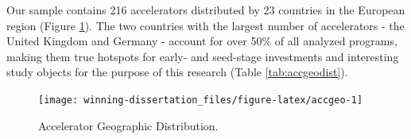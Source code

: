 \documentclass[
  12pt,
]{article}
\begin{document}
Our sample contains 216 accelerators distributed by 23 countries in the European region (Figure \ref{fig:accgeo}). The two countries with the largest number of accelerators - the United Kingdom and Germany - account for over 50\% of all analyzed programs, making them true hotspots for early- and seed-stage investments and interesting study objects for the purpose of this research (Table \ref{tab:accgeodist}).

\begin{figure}

{\centering \texttt{[image: winning-dissertation\_files/figure-latex/accgeo-1]} 

}

\caption{Accelerator Geographic Distribution.}\label{fig:accgeo}
\end{figure}

\onehalfspacing
\end{document}
